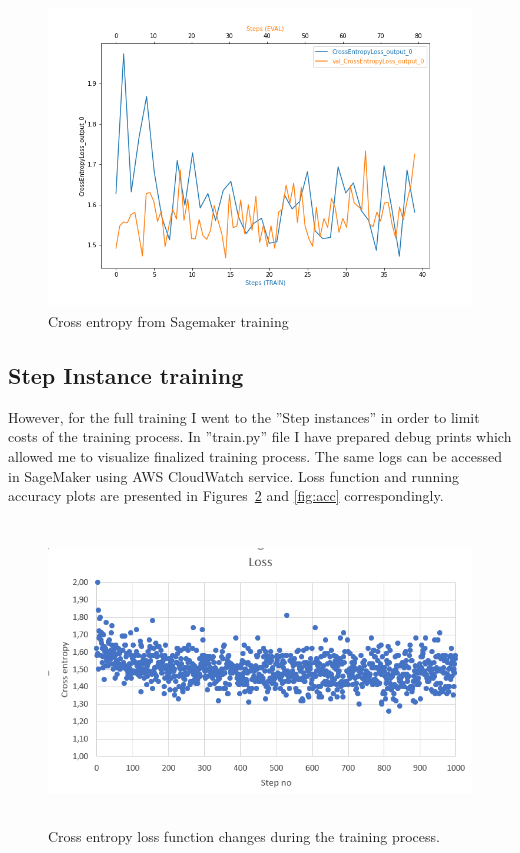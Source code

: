 \documentclass{article}
\begin{document}
\begin{figure}[ht]
	\centering
	\includegraphics[height=80mm]{../project/training_debug_values.png}
	\caption{Cross entropy from Sagemaker training}
	\label{fig:training_sage}
\end{figure}

\subsection{Step Instance training}
However, for the full training I went to the ''Step instances'' in order to limit costs of the training process. In ''train.py'' file I have prepared debug prints which allowed me to visualize finalized training process. The same logs can be accessed in SageMaker using AWS CloudWatch service. Loss function and running accuracy plots are presented in Figures~\ref{fig:loss} and \ref{fig:acc} correspondingly.

\begin{figure}[ht]
	\centering
	\includegraphics[height=80mm]{../project/loss.png}
	\caption{Cross entropy loss function changes during the training process.}
	\label{fig:loss}
\end{figure}
\end{document}

